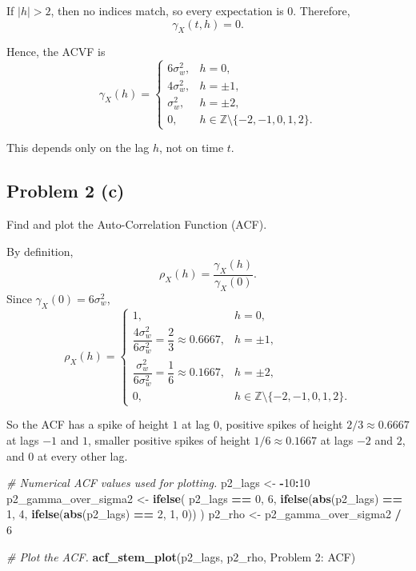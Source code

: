 \documentclass[
  10pt,
]{extarticle}
\newenvironment{Shaded}{\begin{snugshade}}{\end{snugshade}}
\newcommand{\CommentTok}[1]{\textcolor[rgb]{0.56,0.35,0.01}{\textit{#1}}}
\newcommand{\DecValTok}[1]{\textcolor[rgb]{0.00,0.00,0.81}{#1}}
\newcommand{\FunctionTok}[1]{\textcolor[rgb]{0.13,0.29,0.53}{\textbf{#1}}}
\newcommand{\NormalTok}[1]{#1}
\newcommand{\OtherTok}[1]{\textcolor[rgb]{0.56,0.35,0.01}{#1}}
\newcommand{\SpecialCharTok}[1]{\textcolor[rgb]{0.81,0.36,0.00}{\textbf{#1}}}
\newcommand{\StringTok}[1]{\textcolor[rgb]{0.31,0.60,0.02}{#1}}
\begin{document}
If \(|h|>2\), then no indices match, so every expectation is \(0\). Therefore,
\[
\gamma_X(t,h) = 0.
\]

Hence, the ACVF is
\[
\gamma_X(h) =
\begin{cases}
6\sigma_w^2, & h=0,\\
4\sigma_w^2, & h=\pm1,\\
\sigma_w^2, & h=\pm2,\\
0, & h \in \mathbb{Z}\setminus\{-2,-1,0,1,2\}.
\end{cases}
\]

This depends only on the lag \(h\), not on time \(t\).

\newpage

\subsection{Problem 2 (c)}\label{problem-2-c}

\begin{problem}[Problem 2 (c)]
Find and plot the Auto-Correlation Function (ACF).
\end{problem}

By definition,
\[
\rho_X(h) = \frac{\gamma_X(h)}{\gamma_X(0)}.
\]
Since \(\gamma_X(0)=6\sigma_w^2\),
\[
\rho_X(h) =
\begin{cases}
1, & h=0,\\
\dfrac{4\sigma_w^2}{6\sigma_w^2} = \dfrac{2}{3} \approx 0.6667, & h=\pm1,\\
\dfrac{\sigma_w^2}{6\sigma_w^2} = \dfrac{1}{6} \approx 0.1667, & h=\pm2,\\
0, & h \in \mathbb{Z}\setminus\{-2,-1,0,1,2\}.
\end{cases}
\]

So the ACF has a spike of height \(1\) at lag \(0\), positive spikes of height \(2/3 \approx 0.6667\) at lags \(-1\) and \(1\), smaller positive spikes of height \(1/6 \approx 0.1667\) at lags \(-2\) and \(2\), and \(0\) at every other lag.

\begin{Shaded}
\begin{Highlighting}[]
\CommentTok{\# Numerical ACF values used for plotting.}
\NormalTok{p2\_lags }\OtherTok{\textless{}{-}} \SpecialCharTok{{-}}\DecValTok{10}\SpecialCharTok{:}\DecValTok{10}
\NormalTok{p2\_gamma\_over\_sigma2 }\OtherTok{\textless{}{-}} \FunctionTok{ifelse}\NormalTok{(}
\NormalTok{  p2\_lags }\SpecialCharTok{==} \DecValTok{0}\NormalTok{,}
  \DecValTok{6}\NormalTok{,}
  \FunctionTok{ifelse}\NormalTok{(}\FunctionTok{abs}\NormalTok{(p2\_lags) }\SpecialCharTok{==} \DecValTok{1}\NormalTok{, }\DecValTok{4}\NormalTok{, }\FunctionTok{ifelse}\NormalTok{(}\FunctionTok{abs}\NormalTok{(p2\_lags) }\SpecialCharTok{==} \DecValTok{2}\NormalTok{, }\DecValTok{1}\NormalTok{, }\DecValTok{0}\NormalTok{))}
\NormalTok{)}
\NormalTok{p2\_rho }\OtherTok{\textless{}{-}}\NormalTok{ p2\_gamma\_over\_sigma2 }\SpecialCharTok{/} \DecValTok{6}

\CommentTok{\# Plot the ACF.}
\FunctionTok{acf\_stem\_plot}\NormalTok{(p2\_lags, p2\_rho, }\StringTok{\textquotesingle{}Problem 2: ACF\textquotesingle{}}\NormalTok{)}
\end{Highlighting}
\end{Shaded}
\end{document}
